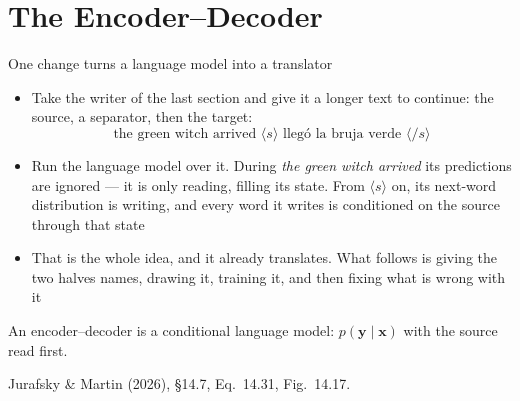 \documentclass[aspectratio=169, 11pt]{beamer}
\newcommand{\srcline}[1]{%
  \par\vspace{0.25em}%
  {\scriptsize\color{mcMuted}\hfill #1\par}}
\newcommand{\bos}{\langle s\rangle}
\newcommand{\eos}{\langle/s\rangle}
\begin{document}
\section{The Encoder--Decoder}

\begin{frame}{One change turns a language model into a translator}
  \vspace{-0.1em}
  {\footnotesize
  \begin{itemize}\itemsep0.30em
    \item Take the writer of the last section and give it a longer text
          to continue: the source, a separator, then the target:
          \[
            \text{the \ green \ witch \ arrived \ } \bos \text{ \ lleg\'o \ la \ bruja \ verde \ } \eos
          \]
    \item Run the language model over it. During \emph{the green witch
          arrived} its predictions are ignored --- it is only
          \alert{reading}, filling its state. From $\bos$ on, its next-word
          distribution is \alert{writing}, and every word it writes is
          conditioned on the source through that state
    \item That is the whole idea, and it already translates. What follows
          is giving the two halves names, drawing it, training it, and
          then fixing what is wrong with it
  \end{itemize}}
  \vspace{0.2em}
  \begin{redhighlight}
    An encoder--decoder is a conditional language model:
    $p(\mathbf{y} \mid \mathbf{x})$ with the source read first.
  \end{redhighlight}
  \srcline{Jurafsky \& Martin (2026), \S14.7, Eq.~14.31, Fig.~14.17.}
\end{frame}
\end{document}
